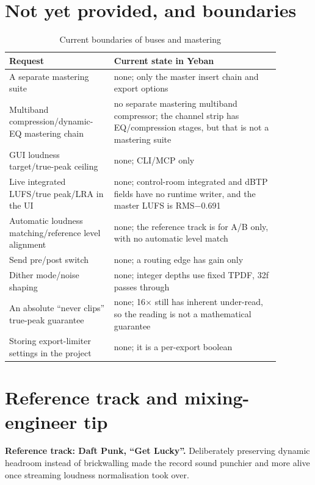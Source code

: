 \section{Not yet provided, and boundaries}

\begin{table}[htbp]
\centering
\small
\begin{tabular}{@{}p{0.34\linewidth}p{0.54\linewidth}@{}}
\hline
Request & Current state in Yeban \\
\hline
A separate mastering suite & none; only the master insert chain and export options \\
Multiband compression/dynamic-EQ mastering chain & no separate mastering multiband compressor; the channel strip has EQ/compression stages, but that is not a mastering suite \\
GUI loudness target/true-peak ceiling & none; CLI/MCP only \\
Live integrated LUFS/true peak/LRA in the UI & none; control-room integrated and dBTP fields have no runtime writer, and the master LUFS is RMS$-$0.691 \\
Automatic loudness matching/reference level alignment & none; the reference track is for A/B only, with no automatic level match \\
Send pre/post switch & none; a routing edge has gain only \\
Dither mode/noise shaping & none; integer depths use fixed TPDF, 32f passes through \\
An absolute ``never clips'' true-peak guarantee & none; 16$\times$ still has inherent under-read, so the reading is not a mathematical guarantee \\
Storing export-limiter settings in the project & none; it is a per-export boolean \\
\hline
\end{tabular}
\caption{Current boundaries of buses and mastering}
\label{tab:mastering-gaps}
\end{table}

\section{Reference track and mixing-engineer tip}

\textbf{Reference track: Daft Punk, ``Get Lucky''.} Deliberately preserving dynamic headroom instead of brickwalling made the record sound punchier and more alive once streaming loudness normalisation took over.

